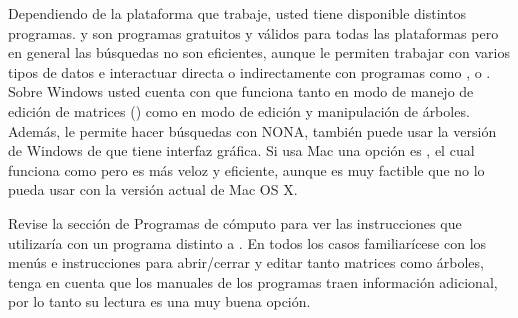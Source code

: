 Dependiendo de la plataforma que trabaje, usted tiene disponible distintos programas.  y  son programas gratuitos y v\'alidos para todas las plataformas pero en general las b\'usquedas no son eficientes, aunque le permiten trabajar con varios tipos de datos e interactuar directa o indirectamente con programas como ,  o . Sobre Windows usted cuenta con  que funciona tanto en modo de manejo de edici\'on de matrices () como en modo de edici\'on y manipulaci\'on de \'arboles. Adem\'as, le permite hacer b\'usquedas con NONA, tambi\'en puede usar la versi\'on de Windows de  que tiene interfaz gr\'afica. Si usa Mac una opci\'on es , el cual funciona como  pero es m\'as veloz y eficiente, aunque es muy factible que no lo pueda usar con la versi\'on actual de Mac OS X.


Revise la secci\'on de Programas de c\'omputo para ver las instrucciones que utilizar\'ia con un programa distinto a . En todos los casos familiar\'icese con los men\'us e instrucciones para abrir/cerrar y editar tanto matrices como \'arboles, tenga en cuenta que los manuales de los programas traen informaci\'on adicional, por lo tanto su lectura es una muy buena opci\'on.



